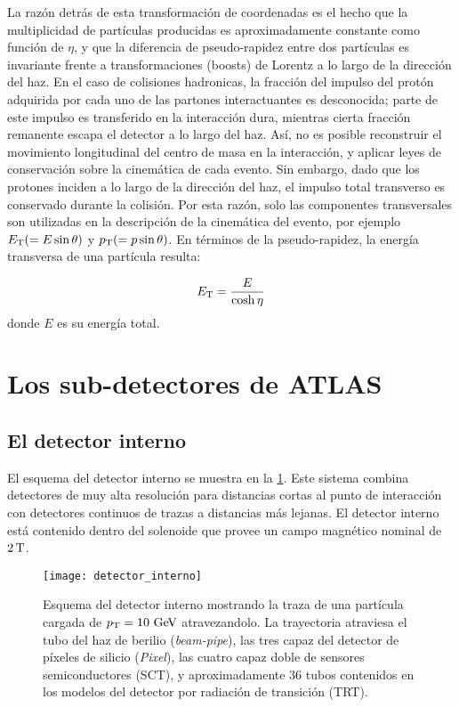 La razón detrás de esta transformación de coordenadas es el hecho que la
multiplicidad de partículas producidas es aproximadamente constante como función
de $\eta$, y que la diferencia de pseudo-rapidez entre dos partículas es
invariante frente a transformaciones (boosts) de Lorentz a lo largo de la
dirección del haz. En el caso de colisiones hadronicas, la fracción del impulso
del protón adquirida por cada uno de las partones interactuantes es desconocida;
parte de este impulso es transferido en la interacción dura, mientras cierta
fracción remanente escapa el detector a lo largo del haz. Así, no es posible
reconstruir el movimiento longitudinal del centro de masa en la interacción, y
aplicar leyes de conservación sobre la cinemática de cada evento. Sin embargo,
dado que los protones inciden a lo largo de la dirección del haz, el impulso
total transverso es conservado durante la colisión. Por esta razón, solo las
componentes transversales son utilizadas en la descripción de la cinemática del
evento, por ejemplo $E_{\mathrm{T}} (= E \sin \theta)$ y $p_{\mathrm{T}} (= p \sin \theta)$. En términos de
la pseudo-rapidez, la energía transversa de una partícula resulta:


\begin{equation}
  \et = \frac{E}{\cosh \eta}
\end{equation}
%
donde $E$ es su energía total.


\section{Los sub-detectores de ATLAS}


\subsection{El detector interno}

El esquema del detector interno se muestra en la
\cref{fig:detector_interno}. Este sistema combina detectores de muy alta
resolución para distancias cortas al punto de interacción con detectores
continuos de trazas a distancias más lejanas. El detector interno está contenido
dentro del solenoide que provee un campo magnético nominal de $\unit[2]{T}$.

\begin{figure}[!htbp]
  \centering

  \texttt{[image: detector\_interno]}
  \caption{Esquema del detector interno mostrando la traza de una partícula
    cargada de $\pt = 10\gev$ atravezandolo. La trayectoria atraviesa el
    tubo del haz de berilio (\emph{beam-pipe}), las tres capaz del detector de píxeles de silicio (\emph{Pixel}),
    las cuatro capaz doble de sensores semiconductores (SCT), y
    aproximadamente 36 tubos contenidos en los modelos del detector por radiación
  de transición (TRT).}\label{fig:detector_interno}

\end{figure}


